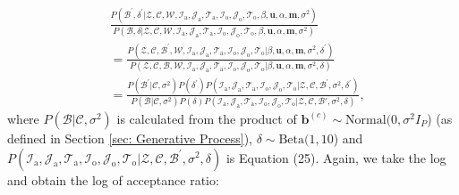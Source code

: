 \documentclass[a4paper]{article}
\begin{document}
 \begin{equation}
 \begin{aligned}
& \frac{P(\mathcal{B}^\prime, \delta^\prime|\mathcal{Z},   \mathcal{C},  \mathcal{W}, \mathcal{I}_{\mbox{a}}, \mathcal{J}_{\mbox{a}}, \mathcal{T}_{\mbox{a}}, \mathcal{I}_{\mbox{o}}, \mathcal{J}_{\mbox{o}}, \mathcal{T}_{\mbox{o}}, \beta, \boldsymbol{u}, \alpha, \boldsymbol{m}, \sigma^2)}{P(\mathcal{B}, \delta|\mathcal{Z},   \mathcal{C},  \mathcal{W}, \mathcal{I}_{\mbox{a}}, \mathcal{J}_{\mbox{a}}, \mathcal{T}_{\mbox{a}}, \mathcal{I}_{\mbox{o}}, \mathcal{J}_{\mbox{o}}, \mathcal{T}_{\mbox{o}}, \beta, \boldsymbol{u}, \alpha, \boldsymbol{m}, \sigma^2)}\\&=\frac{P(\mathcal{Z}, \mathcal{C}, \mathcal{B}^\prime, \mathcal{W}, \mathcal{I}_{\mbox{a}}, \mathcal{J}_{\mbox{a}}, \mathcal{T}_{\mbox{a}},\mathcal{I}_{\mbox{o}}, \mathcal{J}_{\mbox{o}}, \mathcal{T}_{\mbox{o}} |\beta, \boldsymbol{u}, \alpha, \boldsymbol{m}, \sigma^2, \delta^\prime)}{P(\mathcal{Z}, \mathcal{C}, \mathcal{B}, \mathcal{W}, \mathcal{I}_{\mbox{a}}, \mathcal{J}_{\mbox{a}}, \mathcal{T}_{\mbox{a}},\mathcal{I}_{\mbox{o}}, \mathcal{J}_{\mbox{o}}, \mathcal{T}_{\mbox{o}} |\beta, \boldsymbol{u}, \alpha, \boldsymbol{m}, \sigma^2,  \delta)}\\&=\frac{P(\mathcal{B}^\prime|\mathcal{C}, \sigma^2)P(\delta^\prime)P(\mathcal{I}_{\mbox{a}}, \mathcal{J}_{\mbox{a}}, \mathcal{T}_{\mbox{a}},\mathcal{I}_{\mbox{o}}, \mathcal{J}_{\mbox{o}}, \mathcal{T}_{\mbox{o}} |\mathcal{Z}, \mathcal{C}, \mathcal{B}^\prime, \sigma^2, \delta^\prime)}{P(\mathcal{B}|\mathcal{C}, \sigma^2)P(\delta)P(\mathcal{I}_{\mbox{a}}, \mathcal{J}_{\mbox{a}}, \mathcal{T}_{\mbox{a}},\mathcal{I}_{\mbox{o}}, \mathcal{J}_{\mbox{o}}, \mathcal{T}_{\mbox{o}} |\mathcal{Z}, \mathcal{C}, \mathcal{B}\prime, \sigma^2, \delta)},
 \end{aligned}
 \end{equation}
 where $P(\mathcal{B}|\mathcal{C}, \sigma^2)$ is calculated from the product of $\boldsymbol{b}^{(c)}\sim \mbox{Normal}(0, \sigma^2 I_P$) (as defined in Section \ref{sec: Generative Process}), $ \delta \sim \mbox{Beta}(1, 10$) and $P(\mathcal{I}_{\mbox{a}}, \mathcal{J}_{\mbox{a}}, \mathcal{T}_{\mbox{a}},\mathcal{I}_{\mbox{o}}, \mathcal{J}_{\mbox{o}}, \mathcal{T}_{\mbox{o}} |\mathcal{Z}, \mathcal{C}, \mathcal{B}^\prime, \sigma^2, \delta)$ is Equation (25). Again, we take the log and obtain the log of acceptance ratio:
\end{document}

